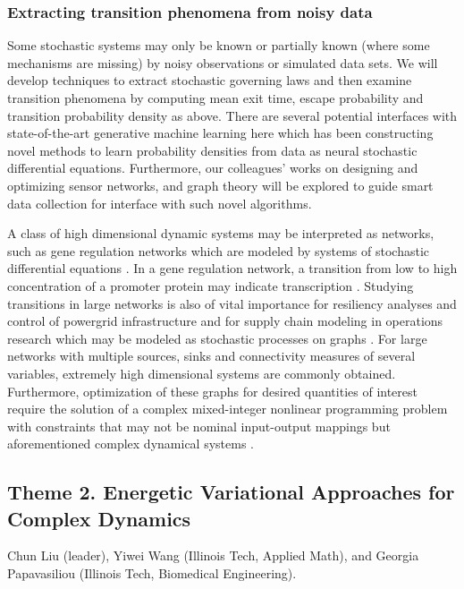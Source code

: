 \documentclass[11pt]{NSFamsart}
\begin{document}
 
\subsubsection*{Extracting transition phenomena from noisy data}
Some   stochastic systems may only be known or partially known (where some mechanisms are missing) by noisy observations or simulated data sets. We will  develop techniques to extract stochastic governing laws \cite{Wei2022AnOC, YangLi2020a, Li2022ExtractingGL, Lu2022LearningTT} and then examine transition phenomena by computing mean exit time, escape probability and transition probability density as above. 
There are several potential interfaces with state-of-the-art generative machine learning here which has been constructing novel methods to learn probability densities from data as neural stochastic differential equations. Furthermore, our colleagues'  works on 
designing and optimizing sensor networks, and graph theory \cite{karwa2016statistical,Calines2008MonitoringSF} will be explored to guide smart data collection for interface with such novel algorithms. 

A class of high dimensional dynamic systems may be interpreted as networks, such as   gene regulation networks \cite{Raser2005} which are modeled by systems of stochastic differential equations \cite{Suel06}.  In a gene regulation network, a transition from low to high concentration of a promoter protein may indicate transcription \cite{Stefan,ZLDK}. Studying transitions in large networks is also of vital importance for resiliency analyses and control of powergrid infrastructure and for supply chain modeling in operations research which may be modeled as stochastic processes on graphs \cite{shin2020graph,anghel2007stochastic,nardelli2014models}. For large networks with multiple sources, sinks and connectivity measures of several variables, extremely high dimensional systems are commonly obtained. Furthermore, optimization of these graphs for desired quantities of interest require the solution of a complex mixed-integer nonlinear programming problem with constraints that may not be nominal input-output mappings but aforementioned complex dynamical systems \cite{shin2020decentralized,sampat2017optimization,kim2019graph,shin2021exponential}.


\subsection*{Theme 2. Energetic Variational Approaches for Complex Dynamics}
Chun Liu (leader), Yiwei Wang (Illinois Tech, Applied Math), and Georgia Papavasiliou (Illinois Tech, Biomedical Engineering).
\end{document}
